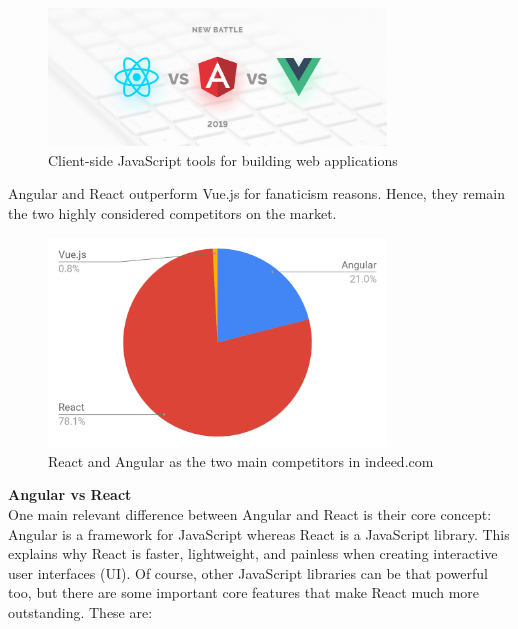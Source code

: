 \begin{figure}
    \centering
        \includegraphics[width=0.8\textwidth]{images/angular.jpeg}
        \caption{Client-side JavaScript tools for building web applications}    
\end{figure}

Angular and React outperform Vue.js for fanaticism reasons. Hence, they remain the two highly considered competitors on the market.\\

\begin{figure}
    \centering
        \includegraphics[width=0.8\textwidth]{images/chart_angular.png}
        \caption{React and Angular as the two main competitors in indeed.com}    
\end{figure}

\vspace{1.0cm}
\noindent
\textbf{Angular vs React}\\
One main relevant difference between Angular and React is their core concept: Angular is a framework for JavaScript whereas React is a JavaScript library. This explains why React is faster, lightweight, and painless when creating interactive user interfaces (UI).
Of course, other JavaScript libraries can be that powerful too, but there are some important core features that make React much more outstanding. These are:


